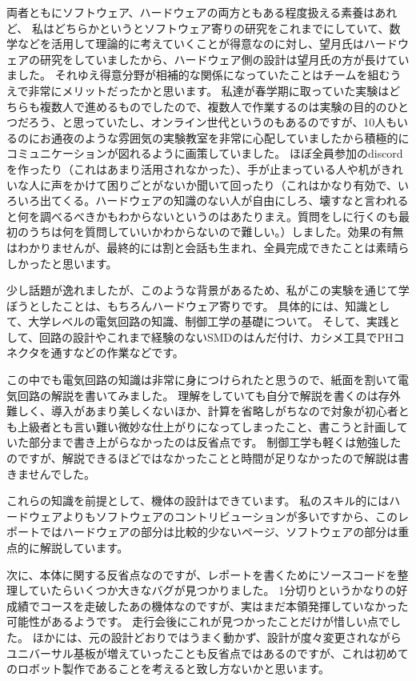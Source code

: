 \documentclass{ltjsreport}
\begin{document}
両者ともにソフトウェア、ハードウェアの両方ともある程度扱える素養はあれど、
私はどちらかというとソフトウェア寄りの研究をこれまでにしていて、数学などを活用して理論的に考えていくことが得意なのに対し、望月氏はハードウェアの研究をしていましたから、ハードウェア側の設計は望月氏の方が長けていました。
それゆえ得意分野が相補的な関係になっていたことはチームを組むうえで非常にメリットだったかと思います。
私達が春学期に取っていた実験はどちらも複数人で進めるものでしたので、複数人で作業するのは実験の目的のひとつだろう、と思っていたし、オンライン世代というのもあるのですが、10人もいるのにお通夜のような雰囲気の実験教室を非常に心配していましたから積極的にコミュニケーションが図れるように画策していました。
ほぼ全員参加のdiscordを作ったり（これはあまり活用されなかった）、手が止まっている人や机がきれいな人に声をかけて困りごとがないか聞いて回ったり（これはかなり有効で、いろいろ出てくる。ハードウェアの知識のない人が自由にしろ、壊すなと言われると何を調べるべきかもわからないというのはあたりまえ。質問をしに行くのも最初のうちは何を質問していいかわからないので難しい。）しました。効果の有無はわかりませんが、最終的には割と会話も生まれ、全員完成できたことは素晴らしかったと思います。

少し話題が逸れましたが、このような背景があるため、私がこの実験を通じて学ぼうとしたことは、もちろんハードウェア寄りです。
具体的には、知識として、大学レベルの電気回路の知識、制御工学の基礎について。
そして、実践として、回路の設計やこれまで経験のないSMDのはんだ付け、カシメ工具でPHコネクタを通すなどの作業などです。

この中でも電気回路の知識は非常に身につけられたと思うので、紙面を割いて電気回路の解説を書いてみました。
理解をしていても自分で解説を書くのは存外難しく、導入があまり美しくないほか、計算を省略しがちなので対象が初心者とも上級者とも言い難い微妙な仕上がりになってしまったこと、書こうと計画していた部分まで書き上がらなかったのは反省点です。
制御工学も軽くは勉強したのですが、解説できるほどではなかったことと時間が足りなかったので解説は書きませんでした。

これらの知識を前提として、機体の設計はできています。
私のスキル的にはハードウェアよりもソフトウェアのコントリビューションが多いですから、このレポートではハードウェアの部分は比較的少ないページ、ソフトウェアの部分は重点的に解説しています。

次に、本体に関する反省点なのですが、レポートを書くためにソースコードを整理していたらいくつか大きなバグが見つかりました。
1分切りというかなりの好成績でコースを走破したあの機体なのですが、実はまだ本領発揮していなかった可能性があるようです。
走行会後にこれが見つかったことだけが惜しい点でした。
ほかには、元の設計どおりではうまく動かず、設計が度々変更されながらユニバーサル基板が増えていったことも反省点ではあるのですが、これは初めてのロボット製作であることを考えると致し方ないかと思います。
\end{document}
